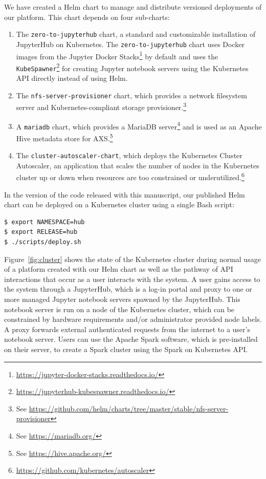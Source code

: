 \documentclass[twocolumn, linenumbers]{aastex631}
\begin{document}
We have created a Helm chart to manage and distribute versioned deployments of our  platform. This chart depends on four sub-charts: 
\begin{enumerate}
    \item The \texttt{zero-to-jupyterhub} chart, a standard and customizable installation of JupyterHub on Kubernetes. The \texttt{zero-to-jupyterhub} chart uses Docker images from the Jupyter Docker Stacks\footnote{\url{https://jupyter-docker-stacks.readthedocs.io/}} by default and uses the \texttt{KubeSpawner}\footnote{\url{https://jupyterhub-kubespawner.readthedocs.io/}} for creating Jupyter notebook servers using the Kubernetes API directly instead of using Helm.
    \item The \texttt{nfs-server-provisioner} chart, which provides a network filesystem server and Kubernetes-compliant storage provisioner.\footnote{See \url{https://github.com/helm/charts/tree/master/stable/nfs-server-provisioner}}
    \item A \texttt{mariadb} chart, which provides a MariaDB server\footnote{See \url{https://mariadb.org/}} and is used as an Apache Hive metadata store for AXS.\footnote{See \url{https://hive.apache.org/}}
    \item The \texttt{cluster-autoscaler-chart}, which deploys the Kubernetes Cluster Autoscaler, an application that scales the number of nodes in the Kubernetes cluster up or down when resources are too constrained or underutilized.\footnote{\url{https://github.com/kubernetes/autoscaler}}
\end{enumerate}

In the version of the code released with this manuscript, our published Helm chart can be deployed on a Kubernetes cluster using a single Bash script:
\begin{lstlisting}[gobble=0]
$ export NAMESPACE=hub
$ export RELEASE=hub
$ ./scripts/deploy.sh
\end{lstlisting}

Figure~\ref{fig:cluster} shows the state of the Kubernetes cluster during normal usage of a platform created with our Helm chart as well as the pathway of API interactions that occur as a user interacts with the system. A user gains access to the system through a JupyterHub, which is a log-in portal and proxy to one or more managed Jupyter notebook servers spawned by the JupyterHub. This notebook server is run on a node of the Kubernetes cluster, which can be constrained by hardware requirements and/or administrator provided node labels. A proxy forwards external authenticated requests from the internet to a user's notebook server. Users can use the Apache Spark software, which is pre-installed on their server, to create a Spark cluster using the Spark on Kubernetes API.
\end{document}
